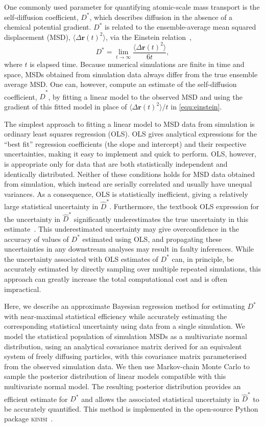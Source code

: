 \documentclass[reprint,superscriptaddress,nobibnotes,amsmath,amssymb,aps,prx,hidelinks]{revtex4-2}
\newcommand{\MSD}[1]{\big\langle\Delta\mathbf{r}{(#1)}^2\big\rangle}
\newcommand{\Dest}{\ensuremath{\widehat{D}^*}}
\newcommand{\D}{\ensuremath{D^*}}
\begin{document}
One commonly used parameter for quantifying atomic-scale mass transport is the self-diffusion coefficient, $\D$, which describes diffusion in the absence of a chemical potential gradient.
$\D$ is related to the ensemble-average mean squared displacement (MSD), $\MSD{t}$, via the Einstein relation~\cite{einstein_uber_1905,helfand_transport_1960},
\begin{equation}
    \D = \lim_{t\to\infty}\frac{\MSD{t}}{6t},
    \label{equ:einstein}
\end{equation}
where $t$ is elapsed time.
Because numerical simulations are finite in time and space, MSDs obtained from simulation data always differ from the true ensemble average MSD.
One can, however, compute an estimate of the self-diffusion coefficient, $\Dest$, by fitting a linear model to the observed MSD and using the gradient of this fitted model in place of $\MSD{t} / t$ in \cref{equ:einstein}.

The simplest approach to fitting a linear model to MSD data from simulation is ordinary least squares regression (OLS).
OLS gives analytical expressions for the ``best fit'' regression coefficients (the slope and intercept) and their respective uncertainties, making it easy to implement and quick to perform.
OLS, however, is appropriate only for data that are both statistically independent and identically distributed.
Neither of these conditions holds for MSD data obtained from simulation, which instead are serially correlated and usually have unequal variances.
As a consequence, OLS is statistically inefficient, giving a relatively large statistical uncertainty in $\Dest$.
Furthermore, the textbook OLS expression for the uncertainty in $\Dest$ significantly underestimates the true uncertainty in this estimate~\cite{UslerEtAl_JComputChem2023}.
This underestimated uncertainty may give overconfidence in the accuracy of values of $\D$ estimated using OLS, and propagating these uncertainties in any downstream analyses may result in faulty inferences.
While the uncertainty associated with OLS estimates of $\D$ can, in principle, be accurately estimated by directly sampling over multiple repeated simulations, this approach can greatly increase the total computational cost and is often impractical.

Here, we describe an approximate Bayesian regression method for estimating $\D$ with near-maximal statistical efficiency while accurately estimating the corresponding statistical uncertainty using data from a single simulation.
We model the statistical population of simulation MSDs as a multivariate normal distribution, using an analytical covariance matrix derived for an equivalent system of freely diffusing particles, with this covariance matrix parameterised from the observed simulation data.
We then use Markov-chain Monte Carlo to sample the posterior distribution of linear models compatible with this multivariate normal model.
The resulting posterior distribution provides an efficient estimate for $\D$ and allows the associated statistical uncertainty in $\Dest$ to be accurately quantified.
This method is implemented in the open-source Python package \textsc{kinisi}~\cite{mccluskey_kinisi_2022}.
\end{document}
